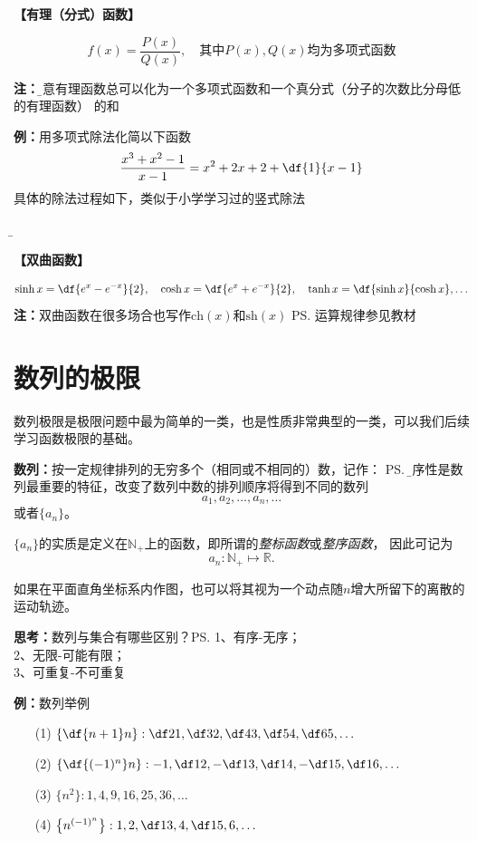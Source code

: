{\bf 【有理（分式）函数】}

$$f(x)=\frac{P(x)}{Q(x)}, \quad\mbox{其中}P(x),Q(x)\mbox{均为多项式函数}$$
  
{\bf 注：}{\b 任意有理函数总可以化为一个多项式函数和一个真分式（分子的次数比分母低的有理函数）
的和}
	  
{{\bf 例：}用多项式除法化简以下函数}
$$\frac{x^3+x^2-1}{x-1}=x^2+2x+2+\df{1}{x-1}$$
具体的除法过程如下，类似于小学学习过的竖式除法
\begin{center}
	{\b {}}
\end{center}

{\bf 【双曲函数】}

{\small $$\sinh x =\df{e^x-e^{-x}}{2}, \quad
\cosh x =\df{e^x+e^{-x}}{2}, \quad\tanh x=\df{\sinh
x}{\cosh x}, \ldots$$}
{\bf 注：}双曲函数在很多场合也写作$\mathrm{ch}(x)$和$\mathrm{sh}(x)$
\ps{运算规律参见教材}

\section{数列的极限}

数列极限是极限问题中最为简单的一类，也是性质非常典型的一类，可以我们后续学习函数极限的基础。

{\bf 数列：}按一定规律排列的无穷多个（相同或不相同的）数，记作：
\ps{\b 有序性是数列最重要的特征，改变了数列中数的排列顺序将得到不同的数列}
$$a_1,a_2,\ldots,a_n,\ldots$$
或者$\{a_n\}$。

$\{a_n\}$的实质是定义在$\mathbb{N}_+$上的函数，即所谓的{\it 整标函数}或{\it 整序函数}，
因此可记为
$$a_n:\mathbb{N}_+\mapsto\mathbb{R}.$$

如果在平面直角坐标系内作图，也可以将其视为一个动点随$n$增大所留下的离散的运动轨迹。

{\bf 思考：}数列与集合有哪些区别？\ps{1、有序-无序；\\ 2、无限-可能有限；\\ 3、可重复-不可重复}

{\bf 例：}数列举例

\begin{enumerate}[(1)]
  \setlength{\itemindent}{1cm}
  \item[(1)] $\left\{\df{n+1}n\right\}:\df 21,\df 32,\df43,\df54,\df65,\ldots$
  \item[(2)] $\left\{\df{(-1)^n}n\right\}:-1,\df12,-\df13,\df14,-\df15,\df16,\ldots$
  \item[(3)] $\{n^2\}:1,4,9,16,25,36,\ldots$
  \item[(4)] $\left\{n^{(-1)^n}\right\}:1,2,\df13,4,\df15,6,\ldots$
\end{enumerate}

